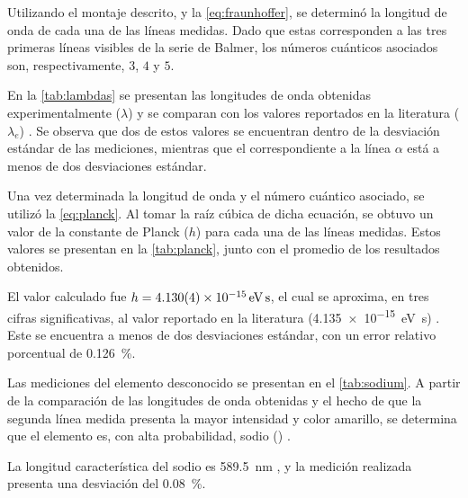 Utilizando el montaje descrito, y la \cref{eq:fraunhoffer}, se determinó la
longitud de onda de cada una de las líneas medidas.
Dado que estas corresponden a las tres primeras líneas visibles
de la serie de Balmer, los números cuánticos asociados son, respectivamente,
\(3\), \(4\) y \(5\).

En la \cref{tab:lambdas} se presentan las longitudes de onda obtenidas
experimentalmente (\( \lambda \)) y se comparan con los valores reportados en
la literatura (\( \lambda_e \)) \cite{blatt1992modern}.
Se observa que dos de estos valores se encuentran dentro de la desviación estándar
de las mediciones, mientras que el correspondiente a la línea \( \alpha \)
está a menos de dos desviaciones estándar.



Una vez determinada la longitud de onda y el número cuántico asociado,
se utilizó la \cref{eq:planck}.
Al tomar la raíz cúbica de dicha ecuación, se obtuvo un valor de la constante de
Planck (\( h \)) para cada una de las líneas medidas.
Estos valores se presentan en la \cref{tab:planck}, junto con el promedio de los
resultados obtenidos.



El valor calculado fue \( h = \planckhexp \), el cual se aproxima, en tres cifras
significativas, al valor reportado en la literatura (\qty{4.135e-15}{\eV\s}) \cite{bureau-international-des-poids-et-mesures-2018}.
Este se encuentra a menos de dos desviaciones estándar,
con un error relativo porcentual de \qty{0.126}{\percent}.

Las mediciones del elemento desconocido se presentan en el \cref{tab:sodium}.
A partir de la comparación de las longitudes de onda obtenidas y el hecho
de que la segunda línea medida presenta la mayor intensidad y color amarillo,
se determina que el elemento es, con alta probabilidad, sodio ()
\cite{PhysRevA.58.1585}.



La longitud característica del sodio es \qty{589.5}{\nano\metre}
\cite{PhysRevA.58.1585}, y la medición realizada presenta una desviación
del \qty{0.08}{\percent}.
